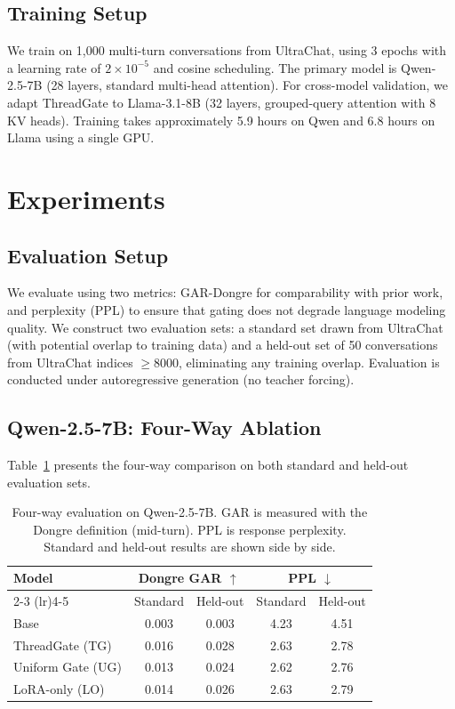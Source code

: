 \documentclass[11pt,a4paper]{article}
\begin{document}
\subsection{Training Setup}

We train on 1,000 multi-turn conversations from UltraChat, using 3 epochs with a learning rate of $2 \times 10^{-5}$ and cosine scheduling. The primary model is Qwen-2.5-7B (28 layers, standard multi-head attention). For cross-model validation, we adapt ThreadGate to Llama-3.1-8B (32 layers, grouped-query attention with 8 KV heads). Training takes approximately 5.9 hours on Qwen and 6.8 hours on Llama using a single GPU.


\section{Experiments}

\subsection{Evaluation Setup}

We evaluate using two metrics: GAR-Dongre for comparability with prior work, and perplexity (PPL) to ensure that gating does not degrade language modeling quality.
We construct two evaluation sets: a standard set drawn from UltraChat (with potential overlap to training data) and a held-out set of 50 conversations from UltraChat indices $\geq 8000$, eliminating any training overlap.
Evaluation is conducted under autoregressive generation (no teacher forcing).

\subsection{Qwen-2.5-7B: Four-Way Ablation}

Table~\ref{tab:qwen_eval} presents the four-way comparison on both standard and held-out evaluation sets.

\begin{table}[t]
\centering
\caption{Four-way evaluation on Qwen-2.5-7B. GAR is measured with the Dongre definition (mid-turn). PPL is response perplexity. Standard and held-out results are shown side by side.}
\label{tab:qwen_eval}
\begin{tabular}{lcccc}
\toprule
\textbf{Model} & \multicolumn{2}{c}{\textbf{Dongre GAR} $\uparrow$} & \multicolumn{2}{c}{\textbf{PPL} $\downarrow$} \\
\cmidrule(lr){2-3} \cmidrule(lr){4-5}
 & Standard & Held-out & Standard & Held-out \\
\midrule
Base              & 0.003  & 0.003  & 4.23 & 4.51 \\
ThreadGate (TG)   & 0.016  & 0.028  & 2.63 & 2.78 \\
Uniform Gate (UG) & 0.013  & 0.024  & 2.62 & 2.76 \\
LoRA-only (LO)    & 0.014  & 0.026  & 2.63 & 2.79 \\
\bottomrule
\end{tabular}
\end{table}
\end{document}
